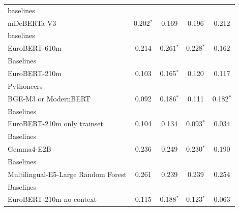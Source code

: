 \begin{tabularx}{\textwidth}{X | c c c c}
baselines\\\subcatarrow{}mDeBERTa V3 & \textcolor{White!50!NavyBlue}{0.202$^{*}$} & \textcolor{NavyBlue}{0.169} & \textcolor{White!50!NavyBlue}{0.196} & \textcolor{White!50!NavyBlue}{0.212} \\
baselines\\\subcatarrow{}EuroBERT-610m & \textcolor{White!50!NavyBlue}{0.214} & \textcolor{White!50!NavyBlue}{0.261$^{*}$} & \textcolor{White!50!NavyBlue}{0.228$^{*}$} & \textcolor{White!50!NavyBlue}{0.162} \\
Baselines\\\subcatarrow{}EuroBERT-210m & \textcolor{NavyBlue}{0.103} & \textcolor{NavyBlue}{0.165$^{*}$} & \textcolor{NavyBlue}{0.120} & \textcolor{White!50!NavyBlue}{0.117} \\
Pythoneers\\\subcatarrow{}BGE-M3 or ModernBERT & \textcolor{NavyBlue}{0.092} & \textcolor{NavyBlue}{0.186$^{*}$} & \textcolor{NavyBlue}{0.111} & \textcolor{White!50!NavyBlue}{0.182$^{*}$} \\
Baselines\\\subcatarrow{}EuroBERT-210m only trainset & \textcolor{NavyBlue}{0.104} & \textcolor{NavyBlue}{0.134} & \textcolor{NavyBlue}{0.093$^{*}$} & \textcolor{NavyBlue}{0.034} \\
Baselines\\\subcatarrow{}Gemma4-E2B & \textcolor{White!50!NavyBlue}{0.236} & \textcolor{White!50!NavyBlue}{0.249} & \textcolor{White!50!NavyBlue}{0.230$^{*}$} & \textcolor{White!50!NavyBlue}{0.190} \\
Baselines\\\subcatarrow{}Multilingual-E5-Large Random Forest & \textcolor{White!50!NavyBlue}{0.261} & \textcolor{White!50!NavyBlue}{0.239} & \textcolor{White!50!NavyBlue}{0.239} & \textcolor{Black}{0.254} \\
Baselines\\\subcatarrow{}EuroBERT-210m no context & \textcolor{NavyBlue}{0.115} & \textcolor{White!50!NavyBlue}{0.188$^{*}$} & \textcolor{NavyBlue}{0.123$^{*}$} & \textcolor{NavyBlue}{0.063} \\
\hline
\end{tabularx}